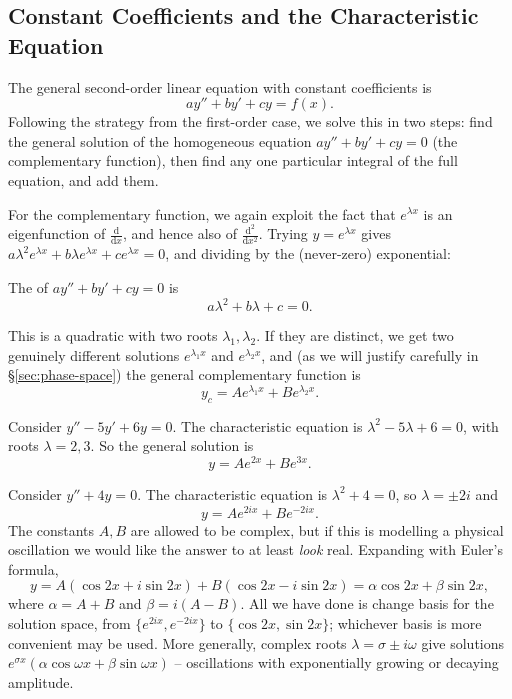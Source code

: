 \documentclass[a4paper]{scrartcl}
\begin{document}
\subsection{Constant Coefficients and the Characteristic Equation}

The general second-order linear equation with constant coefficients is
$$
a y'' + b y' + c y = f(x).
$$
Following the strategy from the first-order case, we solve this in two steps: find the general solution of the homogeneous equation $ay'' + by' + cy = 0$ (the complementary function), then find any one particular integral of the full equation, and add them.

For the complementary function, we again exploit the fact that $e^{\lambda x}$ is an eigenfunction of $\frac{\mathrm{d}}{\mathrm{d}x}$, and hence also of $\frac{\mathrm{d}^2}{\mathrm{d}x^2}$. Trying $y = e^{\lambda x}$ gives $a\lambda^2 e^{\lambda x} + b \lambda e^{\lambda x} + c e^{\lambda x} = 0$, and dividing by the (never-zero) exponential:

\begin{definition}
	The  of $ay'' + by' + cy = 0$ is
	$$
	a\lambda^2 + b\lambda + c = 0.
	$$
\end{definition}

This is a quadratic with two roots $\lambda_1, \lambda_2$. If they are distinct, we get two genuinely different solutions $e^{\lambda_1 x}$ and $e^{\lambda_2 x}$, and (as we will justify carefully in \S\ref{sec:phase-space}) the general complementary function is
$$
y_c = A e^{\lambda_1 x} + B e^{\lambda_2 x}.
$$

\begin{example}
	Consider $y'' - 5y' + 6y = 0$. The characteristic equation is $\lambda^2 - 5\lambda + 6 = 0$, with roots $\lambda = 2, 3$. So the general solution is
	$$
	y = A e^{2x} + B e^{3x}.
	$$
\end{example}

\begin{example}
	Consider $y'' + 4y = 0$. The characteristic equation is $\lambda^2 + 4 = 0$, so $\lambda = \pm 2i$ and
	$$
	y = A e^{2ix} + B e^{-2ix}.
	$$
	The constants $A, B$ are allowed to be complex, but if this is modelling a physical oscillation we would like the answer to at least \emph{look} real. Expanding with Euler's formula,
	$$
	y = A(\cos 2x + i \sin 2x) + B (\cos 2x - i \sin 2x) = \alpha \cos 2x + \beta \sin 2x,
	$$
	where $\alpha = A + B$ and $\beta = i(A - B)$. All we have done is change basis for the solution space, from $\{e^{2ix}, e^{-2ix}\}$ to $\{\cos 2x, \sin 2x\}$; whichever basis is more convenient may be used. More generally, complex roots $\lambda = \sigma \pm i\omega$ give solutions $e^{\sigma x}(\alpha \cos \omega x + \beta \sin \omega x)$ -- oscillations with exponentially growing or decaying amplitude.
\end{example}
\end{document}
